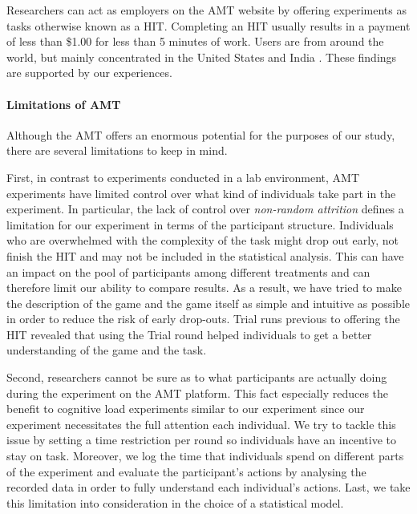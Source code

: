 Researchers can act as employers on the \ac{AMT} website by offering experiments as tasks otherwise known as a \acf{HIT}. Completing an \ac{HIT} usually results in a payment of less than \$1.00 for less than 5 minutes of work. Users are from around the world, but mainly concentrated in the United States and India \citep{Rand2012}. These findings are supported by our experiences.

\paragraph{Limitations of \acl{AMT}}
Although the \ac{AMT} offers an enormous potential for the purposes of our study, there are several limitations to keep in mind.

First, in contrast to experiments conducted in a lab environment, \ac{AMT} experiments have limited control over what kind of individuals take part in the experiment. In particular, the lack of control over \textit{non-random attrition} \citep{Rand2012} defines a limitation for our experiment in terms of the participant structure. Individuals who are overwhelmed with the complexity of the task might drop out early, not finish the \ac{HIT} and may not be included in the statistical analysis. This can have an impact on the pool of participants among different treatments and can therefore limit our ability to compare results. As a result, we have tried to make the description of the game and the game itself as simple and intuitive as possible in order to reduce the risk of early drop-outs. Trial runs previous to offering the \ac{HIT} revealed that using the Trial round helped individuals to get a better understanding of the game and the task.

Second, researchers cannot be sure as to what participants are actually doing during the experiment on the \ac{AMT} platform. This fact especially reduces the benefit to cognitive load experiments similar to our experiment since our experiment necessitates the full attention each individual. We try to tackle this issue by setting a time restriction per round so individuals have an incentive to stay on task. Moreover, we log the time that individuals spend on different parts of the experiment and evaluate the participant's actions by analysing the recorded data in order to fully understand each individual's actions. Last, we take this limitation into consideration in the choice of a statistical model.

